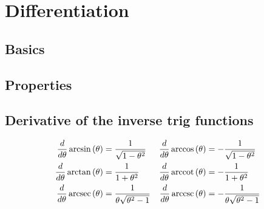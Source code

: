 \documentclass[main.tex]{subfiles}
\begin{document}
\section{Differentiation}
\begin{multicols}{2}
	\subsection*{Basics}
	\subsection*{Properties}
	\subsection*{Derivative of the inverse trig functions}
	\begin{align*}
		\frac{d}{d\theta} \arcsin{(\theta)} &= \frac{1}{\sqrt{1 - \theta^2}} & \frac{d}{d\theta} \arccos{(\theta)} &= -\frac{1}{\sqrt{1 - \theta^2}} \\
		\frac{d}{d\theta} \arctan{(\theta)} &= \frac{1}{1 + \theta^2} & \frac{d}{d\theta} \operatorname{arccot}{(\theta)} &= -\frac{1}{1 + \theta^2} \\
		\frac{d}{d\theta} \operatorname{arcsec}{(\theta)} &= \frac{1}{\theta \sqrt{\theta^2 - 1}} & \frac{d}{d\theta} \operatorname{arccsc}{(\theta)} &= -\frac{1}{\theta \sqrt{\theta^2 - 1}}
	\end{align*}
\end{multicols}
\end{document}
